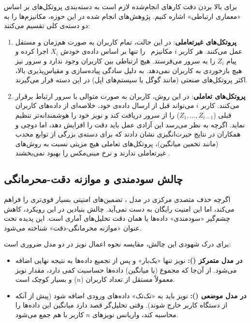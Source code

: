 برای بالا بردن دقت کارهای انجام‌شده لازم است به دسته‌بندی پروتکل‌های
 بر اساس «معماری ارتباطی» اشاره کنیم. پژوهش‌های انجام شده در این حوزه، مکانیزم‌ها را به دو دسته‌ی کلی تقسیم می‌کنند:

\begin{enumerate}
    \item \textbf{پروتکل‌های غیرتعاملی}:
    در این حالت، تمام کاربران به صورت هم‌زمان و مستقل عمل می‌کنند. هر کاربر $i$ مکانیزم \mech \ را تنها بر اساس داده‌ی خودش $X_i$ اجرا کرده و پیام $Z_i$ را به سرور می‌فرستد. هیچ ارتباطی بین کاربران وجود ندارد و سرور نیز هیچ بازخوردی به کاربران نمی‌دهد. به دلیل سادگی پیاده‌سازی و مقیاس‌پذیری بالا، اکثر پروتکل‌های صنعتی (مانند  گوگل یا سیستم‌های اپل) در این دسته قرار می‌گیرند.

    \item \textbf{پروتکل‌های تعاملی}:
    در این روش، کاربران به صورت متوالی با سرور ارتباط برقرار می‌کنند. کاربر $i$ می‌تواند قبل از ارسال داده‌ی خود، خلاصه‌ای از داده‌های کاربران قبلی ($Z_1, \dots, Z_{i-1}$) را از سرور دریافت کند و نویز خود را هوشمندانه‌تر تنظیم نماید. اگرچه به نظر می‌رسد این آزادی عمل باید دقت را افزایش دهد، اما دوچی و همکاران در نتایج حیرت‌انگیزی نشان دادند که برای دسته‌ی بزرگی از توابع محدب (مانند تخمین میانگین)، پروتکل‌های تعاملی هیچ مزیتی نسبت به روش‌های غیرتعاملی ندارند و نرخ مینی‌مکس را بهبود نمی‌بخشند \cite{Duchi2013, Kairouz2016}.
\end{enumerate}


\subsection{چالش سودمندی و موازنه دقت-محرمانگی}
\label{sec:lit:utility-challenge}

اگرچه حذف متصدی مرکزی در مدل ، تضمین‌های امنیتی بسیار قوی‌تری را فراهم می‌کند، اما این امنیت رایگان به دست نمی‌آید. چالش بنیادین در این رویکرد، کاهش چشم‌گیر «سودمندی» داده‌ها یا همان دقت تحلیل‌های آماری است. این پدیده تحت عنوان «موازنه محرمانگی-دقت» شناخته می‌شود.

برای درک شهودی این چالش، مقایسه نحوه اعمال نویز در دو مدل ضروری است:
\begin{itemize}
    \item \textbf{در مدل متمرکز ():} نویز تنها «یک‌بار» و پس از تجمیع داده‌ها به نتیجه نهایی اضافه می‌شود. از آن‌جا که مجموع (یا میانگین) داده‌ها حساسیت کمی دارد، مقدار نویز معمولاً مستقل از تعداد کاربران ($n$) و بسیار کوچک است.
    \item \textbf{در مدل موضعی ():} نویز باید به «تک‌تک» داده‌های ورودی اضافه شود (پیش از آنکه از دستگاه کاربر خارج شوند). وقتی تحلیل‌گر قصد دارد میانگین این داده‌ها را محاسبه کند، واریانس نویزهای $n$ کاربر با هم جمع می‌شود.
\end{itemize}

